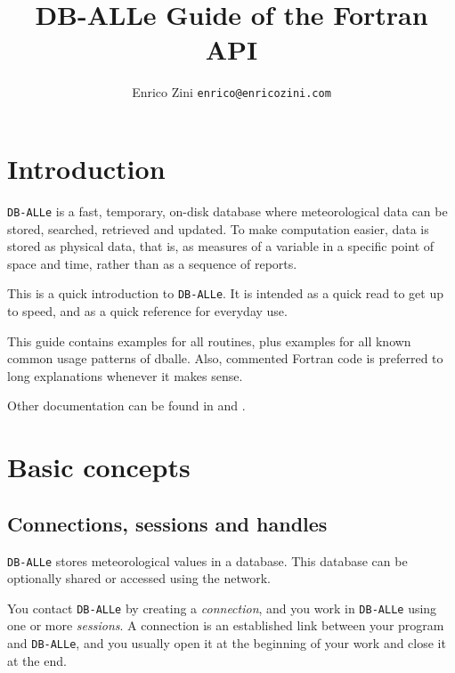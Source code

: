 \documentclass[final,12pt,a4paper,twoside]{book}
\title{DB-ALLe Guide of the Fortran API}
\author{Enrico Zini \hfil {\tt enrico@enricozini.com}}
\newcommand{\dballe}{{\tt DB-ALLe}}
\begin{document}
\setlength{\oddsidemargin}{0pt}
\setlength{\evensidemargin}{0pt}


\maketitle


\tableofcontents

\chapter {Introduction}
\label{ch-intro}

\dballe{} is a fast, temporary, on-disk database where meteorological data can
be stored, searched, retrieved and updated.  To make computation easier, data
is stored as physical data, that is, as measures of a variable in a specific
point of space and time, rather than as a sequence of reports.

This is a quick introduction to \dballe{}.  It is intended as a quick read to
get up to speed, and as a quick reference for everyday use.


This guide contains examples for all routines, plus examples for all known
common usage patterns of dballe.  Also, commented Fortran code is preferred
to long explanations whenever it makes sense.

Other documentation can be found in \cite{UserGuide} and \cite{LibDoc}.

\chapter {Basic concepts}
\label{ch-concepts}

\section{Connections, sessions and handles}

\dballe{} stores meteorological values in a database.  This database can be
optionally shared or accessed using the network.

You contact \dballe{} by creating a \emph{connection}, and you work in
\dballe{} using one or more \emph{sessions}.  A connection is an established
link between your program and \dballe{}, and you usually open it at the
beginning of your work and close it at the end.
\end{document}
